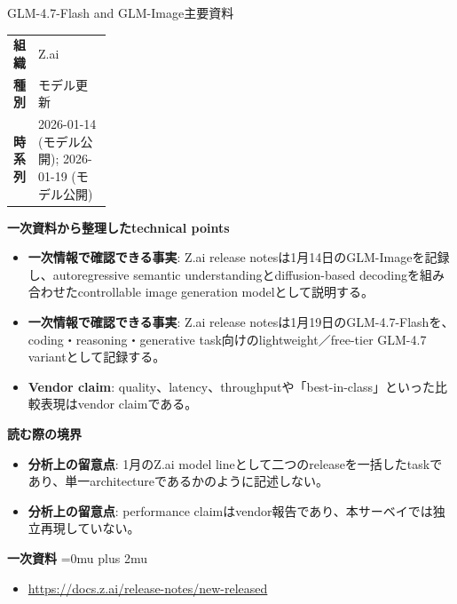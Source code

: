 \begin{technicalnote}{GLM-4.7-Flash and GLM-Image}{主要資料}
\begingroup
\begin{tabularx}{\linewidth}{@{}>{\bfseries}p{0.22\linewidth}X@{}}
組織 & Z.ai \\
種別 & モデル更新 \\
時系列 & 2026-01-14 (モデル公開); 2026-01-19 (モデル公開) \\
\end{tabularx}
\smallskip
{\bfseries 一次資料から整理したtechnical points}
\begin{itemize}[leftmargin=1.5em,itemsep=0.35em]
\item \textbf{一次情報で確認できる事実}: Z.ai release notesは1月14日のGLM-Imageを記録し、autoregressive semantic understandingとdiffusion-based decodingを組み合わせたcontrollable image generation modelとして説明する。
\item \textbf{一次情報で確認できる事実}: Z.ai release notesは1月19日のGLM-4.7-Flashを、coding・reasoning・generative task向けのlightweight／free-tier GLM-4.7 variantとして記録する。
\item \textbf{Vendor claim}: quality、latency、throughputや「best-in-class」といった比較表現はvendor claimである。
\end{itemize}
\begin{minipage}{\linewidth}
{\bfseries 読む際の境界}
\begin{itemize}[leftmargin=1.5em,itemsep=0.35em]
\item \textbf{分析上の留意点}: 1月のZ.ai model lineとして二つのreleaseを一括したtaskであり、単一architectureであるかのように記述しない。
\item \textbf{分析上の留意点}: performance claimはvendor報告であり、本サーベイでは独立再現していない。
\end{itemize}
\begin{samepage}
{\bfseries 一次資料}
\begingroup\sloppy
\Urlmuskip=0mu plus 2mu\relax
\begin{itemize}[leftmargin=1.5em,itemsep=0.25em]
\item {\scriptsize\url{https://docs.z.ai/release-notes/new-released}}
\end{itemize}
\endgroup
\end{samepage}
\end{minipage}
\endgroup
\end{technicalnote}
\medskip

